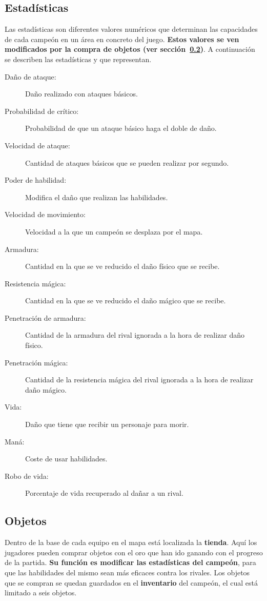 \subsection{Estadísticas}
\label{estadisticas}
Las estadísticas son diferentes valores numéricos que determinan las capacidades de cada campeón en un área en concreto del juego. \textbf{Estos valores se ven modificados por la compra de objetos (ver sección~\ref{objetos})}. A continuación se describen las estadísticas y que representan.
\begin{description}
	\item[Daño de ataque:] Daño realizado con ataques básicos.
	\item[Probabilidad de crítico:] Probabilidad de que un ataque básico haga el doble de daño.
	\item[Velocidad de ataque:] Cantidad de ataques básicos que se pueden realizar por segundo.
	\item[Poder de habilidad:] Modifica el daño que realizan las habilidades.
	\item[Velocidad de movimiento:] Velocidad a la que un campeón se desplaza por el mapa.
	\item[Armadura:] Cantidad en la que se ve reducido el daño físico que se recibe.
	\item[Resistencia mágica:] Cantidad en la que se ve reducido el daño mágico que se recibe.
	\item[Penetración de armadura:] Cantidad de la armadura del rival ignorada a la hora de realizar daño físico.
	\item[Penetración mágica:] Cantidad de la resistencia mágica del rival ignorada a la hora de realizar daño mágico.
	\item[Vida:] Daño que tiene que recibir un personaje para morir.
	\item[Maná:] Coste de usar habilidades.
	\item[Robo de vida:] Porcentaje de vida recuperado al dañar a un rival.
\end{description}

\subsection{Objetos}
\label{objetos}
Dentro de la base de cada equipo en el mapa está localizada la \textbf{tienda}. Aquí los jugadores pueden comprar objetos con el oro que han ido ganando con el progreso de la partida. \textbf{Su función es modificar las estadísticas del campeón}, para que las habilidades del mismo sean más eficaces contra los rivales. Los objetos que se compran se quedan guardados en el \textbf{inventario} del campeón, el cual está limitado a seis objetos.

